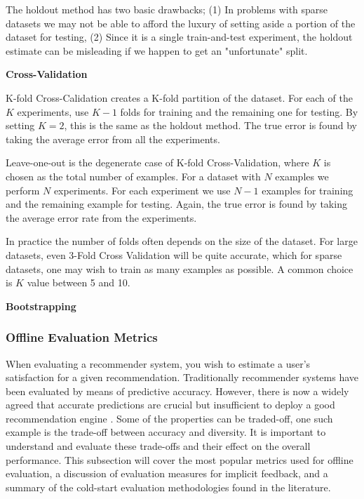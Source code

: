 The holdout method has two basic drawbacks; (1) In problems with sparse datasets we may not be able to afford the luxury of setting aside a portion of the dataset for testing, (2) Since it is a single train-and-test experiment, the holdout estimate can be misleading if we happen to get an "unfortunate" split.

\textbf{Cross-Validation}

K-fold Cross-Calidation creates a K-fold partition of the dataset. For each of the $K$ experiments, use $K-1$ folds for training and the remaining one for testing. By setting $K=2$, this is the same as the holdout method. The true error is found by taking the average error from all the experiments.

Leave-one-out is the degenerate case of K-fold Cross-Validation, where $K$ is chosen as the total number of examples. For a dataset with $N$ examples we perform $N$ experiments. For each experiment we use $N-1$ examples for training and the remaining example for testing. Again, the true error is found by taking the average error rate from the experiments.

In practice the number of folds often depends on the size of the dataset. For large datasets, even 3-Fold Cross Validation will be quite accurate, which for sparse datasets, one may wish to train as many examples as possible. A common choice is $K$ value between 5 and 10.

\textbf{Bootstrapping}


\subsubsection{Offline Evaluation Metrics}

When evaluating a recommender system, you wish to estimate a user's satisfaction for a given recommendation. Traditionally recommender systems have been evaluated by means of predictive accuracy. However, there is now a widely agreed that accurate predictions are crucial but insufficient to deploy a good recommendation engine \cite{Shani2011, McNee2006}. Some of the properties can be traded-off, one such example is the trade-off between accuracy and diversity. It is important to understand and evaluate these trade-offs and their effect on the overall performance. This subsection will cover the most popular metrics used for offline evaluation, a discussion of evaluation measures for implicit feedback, and a summary of the cold-start evaluation methodologies found in the literature.

